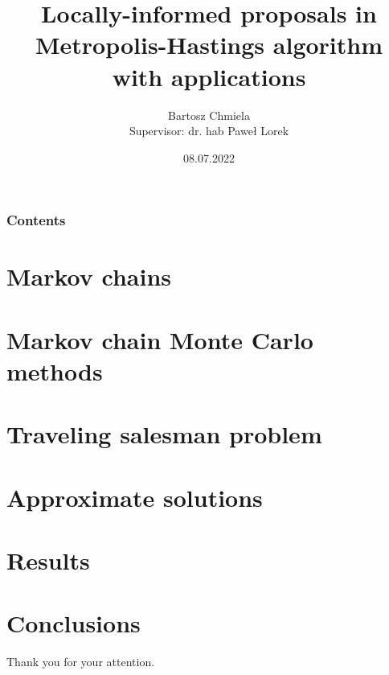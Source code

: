 


\title[LIP]{Locally-informed proposals in Metropolis-Hastings algorithm with applications}
\author[B.Chmiela]{Bartosz Chmiela\\[10mm]{\small Supervisor: dr. hab Paweł Lorek}}
\date{08.07.2022}



	\begin{frame}
		\titlepage
	\end{frame}
	
	\begin{frame}
		\frametitle{Contents}
		\tableofcontents
	\end{frame}

	\section{Markov chains}
		
	
	\section[MCMC]{Markov chain Monte Carlo methods}
		
	
	\section[TSP]{Traveling salesman problem}
		
	
	\section{Approximate solutions}
		
	
	\section{Results}
		

	\section{Conclusions}
		
		
	
	\begin{frame}
		\centering
		Thank you for your attention.
	\end{frame}

	
